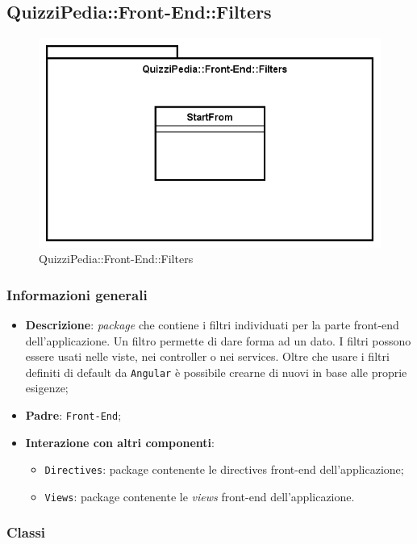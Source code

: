 \newpage
\subsection{QuizziPedia::Front-End::Filters}


\begin{figure} [ht]
	\centering
	\includegraphics[scale=0.42]{UML/Package/QuizziPedia_Front-End_Filters.png}
	\caption{QuizziPedia::Front-End::Filters}
\end{figure} \FloatBarrier

\subsubsection{Informazioni generali}
\begin{itemize}
	\item \textbf{Descrizione}:	\textit{package} che contiene i filtri individuati per la parte front-end dell'applicazione.
	Un filtro permette di dare forma ad un dato. I filtri possono essere usati nelle viste, nei controller o nei services. Oltre che usare i filtri definiti di default da \texttt{Angular} è possibile crearne di nuovi in base alle proprie esigenze; 
	\item \textbf{Padre}: \texttt{Front-End};
	\item \textbf{Interazione con altri componenti}:
	\begin{itemize}
		\item \texttt{Directives}: package contenente le directives front-end dell'applicazione;
		\item \texttt{Views}: package contenente le \textit{views} front-end dell'applicazione.
	\end{itemize} 
\end{itemize}
\subsubsection{Classi}


